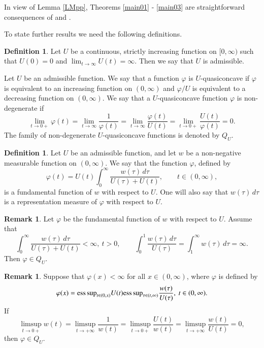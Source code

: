 \documentclass[11pt]{amsart}
\theoremstyle{plain}
\theoremstyle{definition}
\newtheorem{rem}[thm]{Remark}
\newtheorem{defi}[thm]{Definition}
\numberwithin{thm}{section}
\numberwithin{equation}{section}
\begin{document}
In view of Lemma \ref{LMpp}, Theorems \ref{main01} - \ref{main03} are straightforward consequences of \cite[Theorem~3.1]{mu_emb} and \cite[Theorem~4.2]{mu_emb}.

To state further results we need the following definitions.
\begin{defi}
	Let $U$ be a continuous, strictly increasing function on $[0,{\infty})$ such that $U(0)=0$ and $\lim_{t{\rightarrow}{\infty}}U(t)={\infty}$. Then we say that $U$ is admissible.
\end{defi}

Let $U$ be an admissible function. We say that a function ${\varphi}$ is
$U$-quasiconcave if ${\varphi}$ is equivalent to an increasing function on
$(0,{\infty})$ and ${\varphi} / {U}$ is equivalent to a decreasing function on
$(0,\infty)$. We say that a $U$-quasiconcave function ${\varphi}$ is
non-degenerate if
$$
\lim_{t{\rightarrow} 0+} {\varphi}(t) = \lim_{t{\rightarrow} {\infty}} \frac{1}{{\varphi}(t)} = \lim_{t{\rightarrow}
	{\infty}} \frac{{\varphi}(t)}{U(t)} = \lim_{t{\rightarrow} 0+} \frac{U(t)}{{\varphi}(t)} =0.
$$
The family of non-degenerate $U$-quasiconcave functions is denoted
by $Q_U$.
\begin{defi}
	Let $U$ be an admissible function, and let $w$ be a non-negative measurable function on $(0,{\infty})$. We say that the function ${\varphi}$, defined by
	\begin{equation*}
	{\varphi}(t)=U(t)\int_0^{\infty} \frac{w(\tau)\,d\tau}{U(\tau)+U(t)}, {\qquad} t\in (0,{\infty}),
	\end{equation*}
	is a fundamental function of $w$ with respect to $U$. One will also say that $w(\tau)\,d\tau$ is a representation measure of ${\varphi}$ with respect to $U$.
\end{defi}

\begin{rem}\label{nondegrem}
	Let ${\varphi}$ be the fundamental function of $w$ with
	respect to $U$.
	Assume that
	\begin{equation*}
	\int_0^{\infty}\frac{w(\tau)\,d\tau}{U(\tau)+U(t)}<{\infty}, ~ t> 0, {\qquad} \int_0^1 \frac{w(\tau)\,d\tau}{U(\tau)}=\int_1^{\infty}w(\tau)\,d\tau=\infty.
	\end{equation*}
	Then ${\varphi}\in Q_{U}$.
\end{rem}

\begin{rem}\label{limsupcondition}
	Suppose that ${\varphi} (x) < {\infty}$ for all $x \in (0,{\infty})$, where ${\varphi}$ is
	defined by
	\begin{equation*}
	{\varphi}(x)={\operatornamewithlimits{ess\,sup}}_{t\in(0,x)}{U(t)}
	{\operatornamewithlimits{ess\,sup}}_{\tau\in(t,{\infty})}\frac{w(\tau)}{U(\tau)},~~t\in{(0,{\infty})}.
	\end{equation*}
	If
	$$
	\limsup_{t \rightarrow 0 +} w(t) = \limsup_{t \rightarrow +\infty} \frac{1}{w(t)} = \limsup_{t \rightarrow 0 +} \frac{U(t)}{w(t)} = \limsup_{t \rightarrow +\infty} \frac{w(t)}{U(t)} = 0,
	$$
	then
	${\varphi}\in Q_{U}$.
\end{rem}
\end{document}
